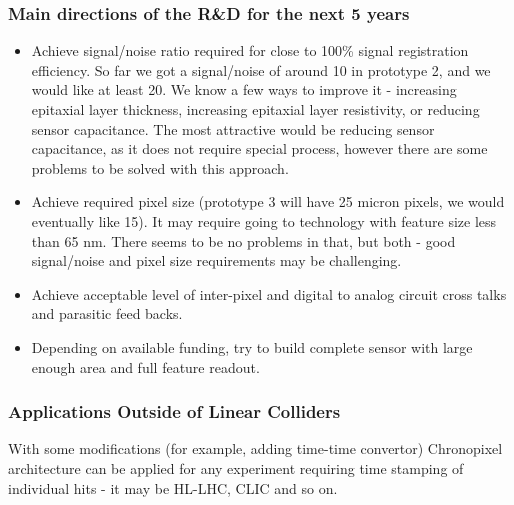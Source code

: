 \subsubsection{Main directions of the R\&D for the next 5 years}
\begin{itemize}
    \item Achieve signal/noise ratio required for close to 100\% signal registration efficiency. So far we got a signal/noise of around 10 in prototype 2, and we would like at least 20. We know a few ways to improve it - increasing epitaxial layer thickness, increasing epitaxial layer resistivity, or reducing sensor capacitance. The most attractive would be reducing sensor capacitance, as it does not require special process, however there are some problems to be solved with this approach.
    \item Achieve required pixel size (prototype 3 will have 25 micron pixels, we would eventually like 15). It may require going to technology with feature size less than 65 nm. There seems to be no problems in that, but both - good signal/noise and pixel size requirements may be challenging.
    \item Achieve acceptable level of inter-pixel and digital to analog circuit cross talks and parasitic feed backs.
    \item Depending on available funding, try to build complete sensor with large enough area and full feature readout.
\end{itemize}
\subsubsection{Applications Outside of Linear Colliders}
     With some modifications (for example, adding time-time convertor) Chronopixel architecture can be applied for any experiment requiring time stamping of individual hits - it may be HL-LHC, CLIC and so on.
